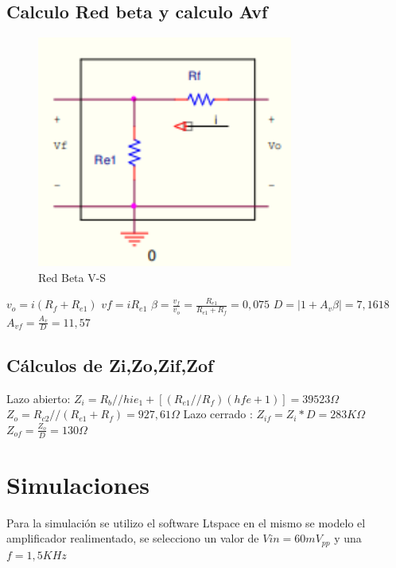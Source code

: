 \documentclass[12pt, letterpaper]{article}
\begin{document}
\subsection{Calculo Red beta y calculo Avf}
\begin{figure}[h!]
	\centering
	\includegraphics[width=0.75\textwidth]{Imagenes/Screenshot_58.png}
	\caption{Red Beta  V-S}
	\label{fig:4}
\end{figure}
\singlespacing
$v_o=i(R_f+R_{e1})$ \hspace{1cm} $vf=iR_{e1}$
\singlespacing
$\beta = \frac{v_f}{v_o}=\frac{R_{e1}}{R_{e1}+R_f}=0,075$
\singlespacing
$D=|1+A_v\beta|=7,1618$ \hspace{1cm} $A_{vf}=\frac{A_v}{D}=11,57$
\subsection{Cálculos de Zi,Zo,Zif,Zof}
Lazo abierto:
$Z_i=R_b//{hie_1+[(R_{e1}//R_f)(hfe+1)]}=39523\Omega$
\singlespacing
$Z_o=R_{c2}//(R_{e1}+R_f)=927,61\Omega$
\singlespacing
Lazo cerrado :
$Z_{if}=Z_i*D=283K\Omega$
\singlespacing
$Z_{of}=\frac{Z_o}{D}=130\Omega$
\section{Simulaciones}
Para la simulación se utilizo el software Ltspace en el mismo se modelo el amplificador realimentado, se selecciono un valor de $Vin=60mV_{pp}$ y una $f=1,5KHz$
\end{document}
